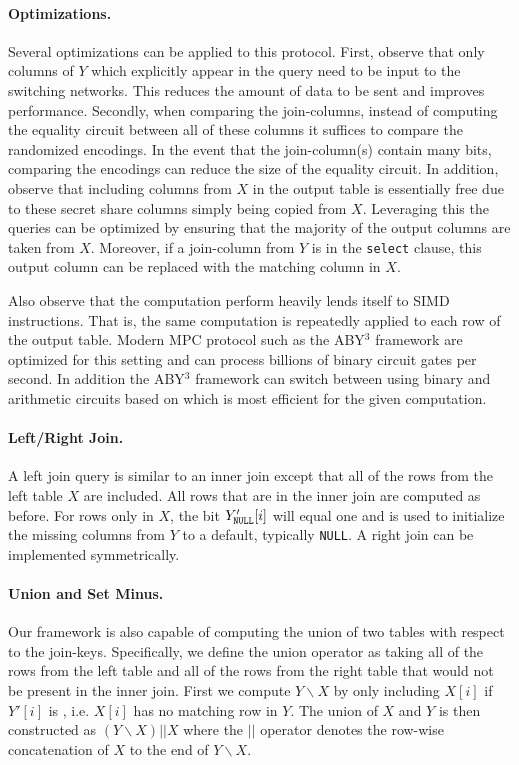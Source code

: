 \iffullversion
\paragraph{Optimizations.}
Several optimizations can be applied to this protocol. First, observe that only columns of $Y$ which explicitly appear in the query need to be input to the switching networks. This reduces the amount of data to be sent and improves performance. Secondly, when comparing the join-columns, instead of computing the equality circuit between all of these columns it suffices to compare the randomized encodings. In the event that the join-column(s) contain many bits, comparing the encodings can reduce the size of the equality circuit. In addition, observe that including columns from $X$ in the output table is essentially free due to these secret share columns simply being copied from $X$. Leveraging this the queries can be optimized by ensuring that the majority of the output columns are taken from $X$. Moreover, if a join-column from $Y$ is in the \texttt{select} clause, this output column can be replaced with the matching column in $X$.

Also observe that the computation perform heavily lends itself to SIMD instructions. That is, the same computation is repeatedly applied to each row of the output table. Modern MPC protocol such as the ABY$^3$ framework \cite{aby3,highthroughput} are optimized for this setting and can process billions of binary circuit gates per second\cite{highthroughput}. In addition the ABY$^3$ framework can switch between using binary and arithmetic circuits based on which is most efficient for the given computation. 
\fi

\paragraph{Left/Right Join.}
A left join query is similar to an inner join except that all of the rows from the left table $X$ are included. All rows that are in the inner join are computed as before. For rows only in $X$, the bit $Y_\texttt{NULL}'[i]$ will equal one and is used to initialize the missing columns from $Y$ to a default, typically \texttt{NULL}. A right join can be implemented symmetrically.

\paragraph{Union and Set Minus.}
Our framework is also capable of computing the union of two tables with respect to the join-keys. Specifically, we define the union operator as taking all of the rows from the left table and all of the rows from the right table that would not be present in the inner join. First we compute $Y\backslash X$ by only including $X[i]$ if $Y'[i]$ is \Null, i.e. $X[i]$ has no matching row in $Y$. The union of $X$ and $Y$ is then constructed as $(Y\backslash X) || X$ where the $||$ operator denotes the row-wise concatenation of $X$ to the end of $Y\backslash X$.


